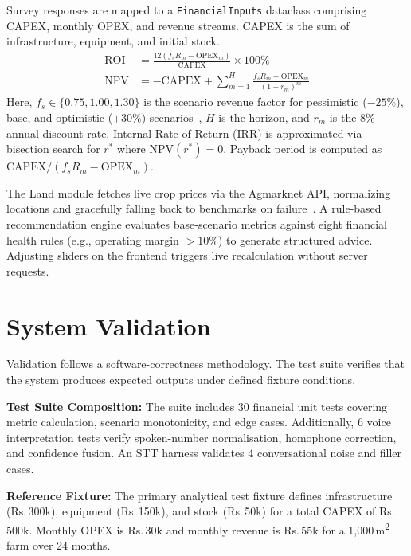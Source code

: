 \documentclass[conference]{IEEEtran}
\newcommand{\inr}[1]{Rs.\,#1}
\begin{document}
Survey responses are mapped to a \texttt{FinancialInputs} dataclass comprising CAPEX, monthly OPEX, and revenue streams. CAPEX is the sum of infrastructure, equipment, and initial stock. 
\begin{align}
  \mathrm{ROI}   &= \frac{12(f_s R_m - \mathrm{OPEX}_m)}
                          {\mathrm{CAPEX}} \times 100\%
                    \label{eq:roi} \\
  \mathrm{NPV} &= -\mathrm{CAPEX} +
    \sum_{m=1}^{H}
      \frac{f_s R_m - \mathrm{OPEX}_m}{(1+r_m)^{m}}
  \label{eq:npv}
\end{align}
Here, $f_s \in \{0.75, 1.00, 1.30\}$ is the scenario revenue factor for pessimistic ($-25\%$), base, and optimistic ($+30\%$) scenarios~\cite{ref4}, $H$ is the horizon, and $r_m$ is the 8\% annual discount rate. Internal Rate of Return (IRR) is approximated via bisection search for $r^*$ where $\mathrm{NPV}(r^*)=0$. Payback period is computed as $\mathrm{CAPEX} / (f_s R_m - \mathrm{OPEX}_m)$. 

The Land module fetches live crop prices via the Agmarknet API, normalizing locations and gracefully falling back to benchmarks on failure~\cite{ref11,ref17}. A rule-based recommendation engine evaluates base-scenario metrics against eight financial health rules (e.g., operating margin $>10\%$) to generate structured advice. Adjusting sliders on the frontend triggers live recalculation without server requests.

\section{System Validation}
\label{sec:eval}

Validation follows a software-correctness methodology. The test suite verifies that the system produces expected outputs under defined fixture conditions.

\textbf{Test Suite Composition:} The suite includes 30 financial unit tests covering metric calculation, scenario monotonicity, and edge cases. Additionally, 6 voice interpretation tests verify spoken-number normalisation, homophone correction, and confidence fusion. An STT harness validates 4 conversational noise and filler cases. 

\textbf{Reference Fixture:} The primary analytical test fixture defines infrastructure (\inr{300k}), equipment (\inr{150k}), and stock (\inr{50k}) for a total CAPEX of \inr{500k}. Monthly OPEX is \inr{30k} and monthly revenue is \inr{55k} for a 1,000\,m\textsuperscript{2} farm over 24 months.
\end{document}
